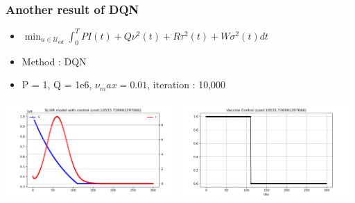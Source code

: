 \documentclass[usenames,dvipsnames, aspectratio=169, 9pt]{beamer}
\begin{document}
\begin{frame}\frametitle{Another result of DQN}
\begin{itemize}
\item $ \min_{u\in\mathcal{U}_{ad}} \int_0^T PI(t) + Q\nu^2(t) + R\tau^2(t) + W\sigma^2(t) dt$
\item Method : DQN
\item P = 1, Q = 1e6, $\nu_max = 0.01$, iteration : 10,000
\end{itemize}
    \centering
    \includegraphics[width=6.5cm]{figure/sliar_dqn_numax.png}
    \includegraphics[width=6.5cm]{figure/sliar_dqn_numax_control.png}
\end{frame}
\end{document}
